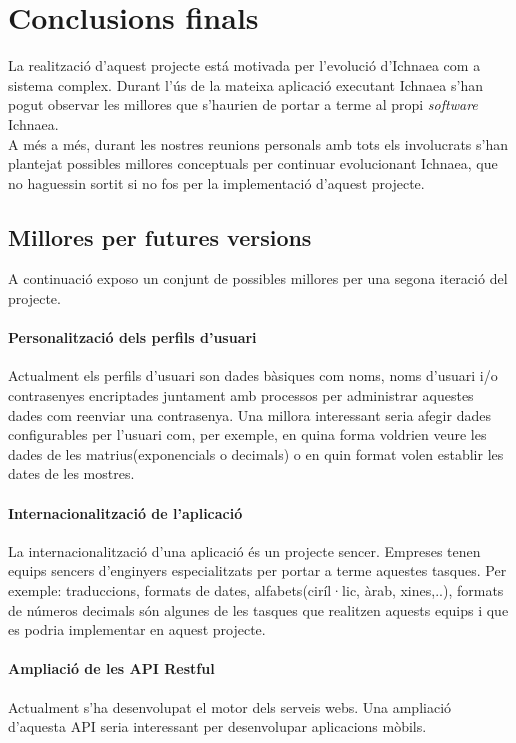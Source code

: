 \section{Conclusions finals}
La realització d'aquest projecte est\'{a} motivada per l'evolució d'Ichnaea com a sistema complex. Durant l'\'{u}s de la mateixa aplicació executant Ichnaea s'han pogut observar les millores que s'haurien de portar a terme al propi \textit{software} Ichnaea.\\

A m\'{e}s a m\'{e}s, durant les nostres reunions personals amb tots els involucrats s'han plantejat possibles millores conceptuals per continuar evolucionant Ichnaea, que no haguessin sortit si no fos per la implementació d'aquest projecte. 

\subsection{Millores per futures versions}
A continuació exposo un conjunt de possibles millores per una segona iteració del projecte.

\paragraph*{Personalitzaci\'{o} dels perfils d'usuari} Actualment els perfils d'usuari son dades bàsiques com noms, noms d'usuari i/o contrasenyes encriptades juntament amb processos per administrar aquestes dades com reenviar una contrasenya. Una millora interessant seria afegir dades configurables per l'usuari com, per exemple, en quina forma voldrien veure les dades de les matrius(exponencials o decimals) o en quin format volen establir les dates de les mostres.

\paragraph*{Internacionalització de l'aplicació} La internacionalització d'una aplicació \'{e}s un projecte sencer. Empreses tenen equips sencers d'enginyers especialitzats per portar a terme aquestes tasques. Per exemple: traduccions, formats de dates, alfabets(ciríl·lic, àrab, xines,..), formats de números decimals s\'{o}n algunes de les tasques que realitzen aquests equips i que es podria implementar en aquest projecte. 

\paragraph*{Ampliaci\'{o} de les API Restful} Actualment s'ha desenvolupat el motor dels serveis webs. Una ampliació d'aquesta API seria interessant per desenvolupar aplicacions mòbils.

